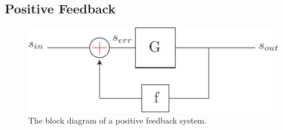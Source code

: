 \subsection{Positive Feedback}
\begin{figure}[tb]
\begin{center}
\includegraphics[scale=.7]{fbblock_posfb}
\end{center}
\caption{The block diagram of a positive feedback system.}
\label{fig:fbblock_posfb}
\end{figure}

